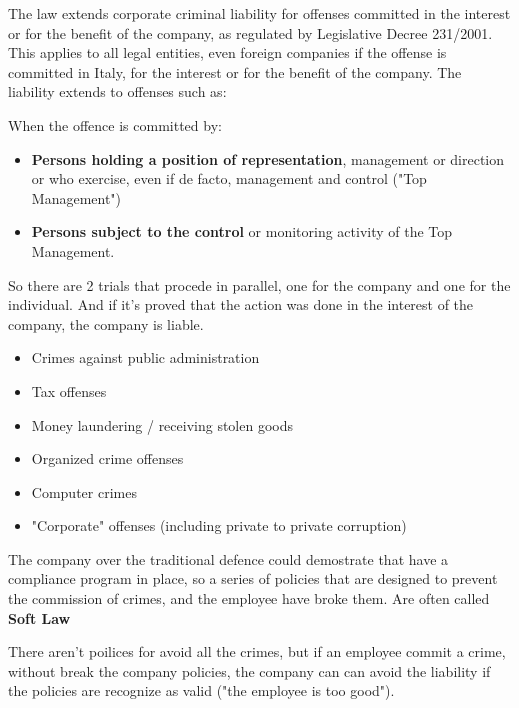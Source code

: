 The law extends corporate criminal liability for offenses committed in the interest or for the benefit of the company, as regulated by Legislative Decree 231/2001. This applies to all legal entities, even foreign companies if the offense is committed in Italy, for the interest or for the benefit of the company. The liability extends to offenses such as:

When the offence is committed by:
\begin{itemize}[itemsep=0pt]
    \item \textbf{Persons holding a position of representation}, management or direction or who exercise, even if de facto, management and control ("Top Management")
    \item \textbf{Persons subject to the control} or monitoring activity of the Top Management.
\end{itemize}

\begin{boxH}
    So there are 2 trials that procede in parallel, one for the company and one for the individual. And if it's proved that the action was done in the interest of the company, the company is liable.
\end{boxH}

\begin{multicols}{2}
\begin{itemize}[itemsep=0pt]
    \item Crimes against public administration
    \item Tax offenses
    \item Money laundering / receiving stolen goods
    \item Organized crime offenses
    \item Computer crimes
    \item "Corporate" offenses (including private to private corruption)
\end{itemize}
\end{multicols}

\begin{boxH}
    The company over the traditional defence could demostrate that have a compliance program in place, so a series of policies that are designed to prevent the commission of crimes, and the employee have broke them. Are often called \textbf{Soft Law}
\end{boxH}

There aren't poilices for avoid all the crimes, but if an employee commit a crime, without break the company policies, the company can can avoid the liability if the policies are recognize as valid ("the employee is too good").

